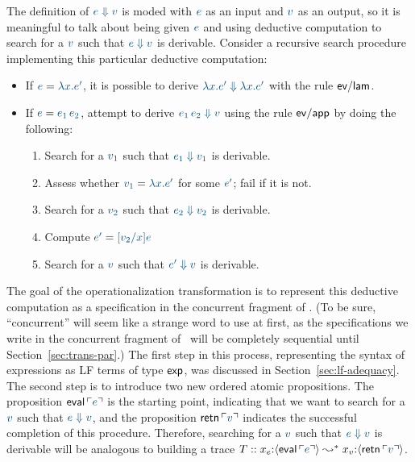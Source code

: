 The definition of $\obj{e \Downarrow v}$ is moded with $\obj{e}$ as an
input and $\obj{v}$ as an output, so it is meaningful to talk about
being given $\obj{e}$ and using deductive computation to search for a
$\obj{v}$ such that $\obj{e \Downarrow v}$ is derivable.  Consider a
recursive search procedure implementing this particular deductive
computation: 
\smallskip
\begin{itemize}
\item
      If $\obj{e} = \obj{\lambda x. e'}$, 
      it is possible to derive 
      $\obj{\lambda x. e' \Downarrow \lambda x. e'}$
      with the rule ${\sf ev/lam}$.
\item
       If $\obj{e} = \obj{e_1\,e_2}$,
       attempt to derive 
       $\obj{e_1\,e_2 \Downarrow v}$
       using the rule ${\sf ev/app}$ by doing the following:
    \begin{enumerate}
    \item Search for a $\obj{v_1}$ such that 
          $\obj{e_1 \Downarrow v_1}$ is derivable.
    \item Assess whether $\obj{v_1} = \obj{\lambda x.e'}$ for some
          $\obj{e'}$; fail if it is not.
    \item Search for a $\obj{v_2}$ such that 
          $\obj{e_2 \Downarrow v_2}$ is derivable.
    \item Compute $\obj{e'} = \obj{[v_2/x]e}$
    \item Search for a $\obj{v}$ such that 
          $\obj{e' \Downarrow v}$ is derivable.
    \end{enumerate}
\end{itemize}
\smallskip
%
The goal of the operationalization transformation is to represent this
deductive computation as a specification in the concurrent fragment of
\sls. (To be sure, ``concurrent'' will seem 
like a strange word to use at first, as
the specifications we write in the concurrent fragment of \sls~will 
be completely sequential until Section~\ref{sec:trans-par}.)
The first step in this process, representing the syntax
of expressions as LF terms of type ${\sf exp}$, was discussed
in Section~\ref{sec:lf-adequacy}. The second step is to
introduce two new ordered atomic propositions.  The proposition ${\sf
  eval}\,\interp{e}$ is the starting point, indicating that we want to
search for a $\obj{v}$ such that $\obj{e \Downarrow v}$,
 and the proposition ${\sf
  retn}\,\interp{v}$ indicates the successful completion of this
procedure. Therefore, searching for a $\obj{v}$ such that 
$\obj{e \Downarrow v}$
is derivable will be analogous to building a trace $T ::
x_e{:}\susp{{\sf eval}\,\interp{e}} \leadsto^* x_v{:}\susp{{\sf
    retn}\,\interp{v}}$.

